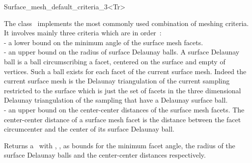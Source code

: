 
\begin{ccRefClass}{Surface_mesh_default_criteria_3<Tr>}

\ccDefinition
  
The class \ccRefName\  implements  the most commonly used combination
of meshing criteria. It involves mainly three criteria which are
in order~: \\
- a lower bound on the minimum angle of the surface mesh facets. \\
- an upper bound on the radius of surface Delaunay balls.
 A surface Delaunay ball is a  ball circumscribing  a facet,
centered on the surface and empty of vertices.
 Such a ball exists for each facet
of the current surface mesh.
Indeed  the current surface mesh
is  the Delaunay triangulation of the current sampling restricted to
the surface 
which is just the set of facets in the three dimensional  Delaunay triangulation of
the sampling  that  have a Delaunay surface ball. \\
- an upper bound on the center-center distances of the surface mesh facets.
  The center-center distance of a surface mesh facet 
  is the distance between the facet circumcenter and the 
  center of its  surface Delaunay ball. 


\ccIsModel


\ccTypes


\ccCreation
{}

{Returns a \ccRefName\ with , ,
 as bounds for the minimum facet angle,
the radius of the surface Delaunay balls 
and the center-center distances respectively.}

\ccSeeAlso


\end{ccRefClass}


